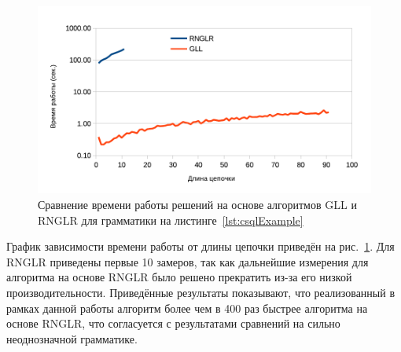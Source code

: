 \begin{figure}
 \centering
 \includegraphics[width=\textwidth]{Ragozina/pics/BioLog.pdf}
 \caption{Сравнение времени работы решений на основе алгоритмов GLL и RNGLR для грамматики на листинге~\ref{lst:csqlExample}}
 \label{fig:Stack}
\end{figure}

График зависимости времени работы от длины цепочки приведён на рис.~\ref{fig:Stack}. Для RNGLR приведены первые 10 замеров, так как дальнейшие измерения для алгоритма на основе RNGLR было решено прекратить из-за его низкой производительности. Приведённые результаты показывают, что реализованный в рамках данной работы алгоритм более чем в 400 раз быстрее алгоритма на основе RNGLR, что согласуется с результатами сравнений на сильно неоднозначной грамматике.
